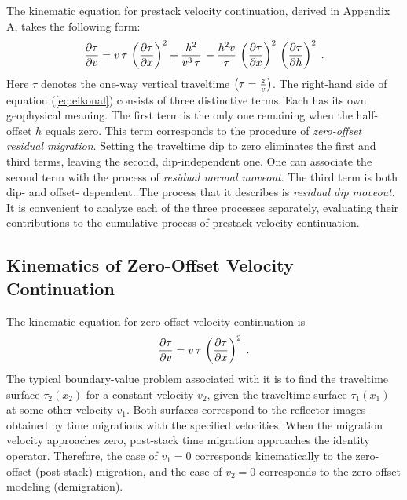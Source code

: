 The kinematic equation for prestack velocity continuation, derived in
Appendix A, takes the following form:
\begin{equation}
{{\partial \tau} \over {\partial v}} = 
v\,\tau\,\left({{\partial \tau} \over {\partial x}}\right)^2 +
{{h^2} \over {v^3\,\tau}}\,- 
\frac{h^2 v}{\tau}\,
\left({{\partial \tau} \over {\partial x}}\right)^2\,
\left({{\partial \tau} \over {\partial h}}\right)^2\;.
\label{eq:eikonal} 
\end{equation}
Here $\tau$ denotes the one-way vertical traveltime $\left(\tau = {z
\over v}\right)$. The right-hand side of equation (\ref{eq:eikonal})
consists of three distinctive terms. Each has its own geophysical meaning. The first term is the only one remaining
when the half-offset $h$ equals zero. This term corresponds to the procedure of
{\em zero-offset residual migration}.  Setting the traveltime dip to
zero eliminates the first and third terms, leaving the second,
dip-independent one. One can associate the second term with the process of
{\em residual normal moveout}. The third term is both dip- and offset-
dependent. The process that it describes is {\em residual dip
moveout}. It is convenient to analyze each of the three processes
separately, evaluating their contributions to the cumulative process
of prestack velocity continuation.

\subsection{Kinematics of Zero-Offset Velocity Continuation}
The kinematic equation for zero-offset velocity continuation is
\begin{equation}
{{\partial \tau} \over {\partial v}} = 
v\,\tau\,\left({{\partial \tau} \over {\partial x}}\right)^2\;.
\label{eq:POMeikonal} 
\end{equation}
The typical boundary-value problem associated with it is to find the
traveltime surface $\tau_2(x_2)$ for a constant velocity $v_2$, given the
traveltime surface $\tau_1(x_1)$ at some other velocity $v_1$. Both surfaces
correspond to the reflector images obtained by time migrations with the
specified velocities.  When the migration velocity approaches zero, post-stack
time migration approaches the identity operator. Therefore, the case of $v_1 =
0$ corresponds kinematically to the zero-offset (post-stack) migration, and
the case of $v_2 = 0$ corresponds to the zero-offset modeling (demigration).

